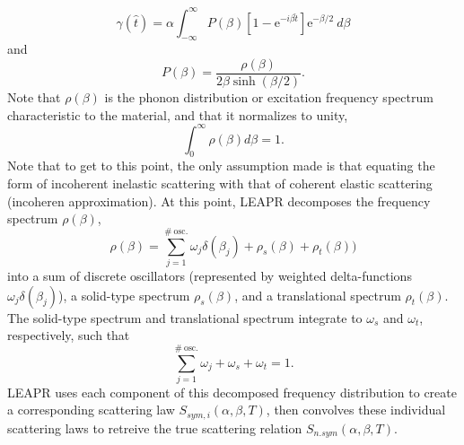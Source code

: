 \documentclass[../master.tex]{subfiles}
\begin{document}
			\begin{equation} 
				\gamma(\hat{t})=\alpha\int_{-\infty}^{\infty}P(\beta)\left[1-\mathrm{e}^{-i\beta\hat{t}}\right]\mathrm{e}^{-\beta/2}~d\beta\label{eq:gamma}
			\end{equation}
			and
			\begin{equation}
				P(\beta)=\frac{\rho(\beta)}{2\beta\sinh(\beta/2)}.
			\end{equation}
			Note that $\rho(\beta)$ is the phonon distribution or excitation frequency spectrum characteristic to the material, and that it normalizes to unity,
			\begin{equation}
				\int_{0}^{\infty}\rho(\beta)d\beta=1.
			\end{equation}
			Note that to get to this point, the only assumption made is that equating the form of incoherent inelastic scattering with that of coherent elastic scattering (incoheren approximation). At this point, LEAPR decomposes the frequency spectrum $\rho(\beta)$,
			\begin{equation}
				\rho(\beta)=\sum_{j=1}^{\#~\mbox{osc.}}\omega_j\delta(\beta_j)+\rho_s(\beta)+\rho_t(\beta))
			\end{equation}
			into a sum of discrete oscillators (represented by weighted delta-functions $\omega_j\delta(\beta_j)$), a solid-type spectrum $\rho_s(\beta)$, and a translational spectrum $\rho_t(\beta)$. The solid-type spectrum and translational spectrum integrate to $\omega_s$ and $\omega_t$, respectively, such that 
			\begin{equation}
				\sum_{j=1}^{\#~\mbox{osc.}}\omega_j + \omega_s + \omega_t = 1.
			\end{equation}
			LEAPR uses each component of this decomposed frequency distribution to create a corresponding scattering law $S_{sym,i}(\alpha,\beta,T)$, then convolves these individual scattering laws to retreive the true scattering relation $S_{n.sym}(\alpha,\beta,T)$.
\end{document}
